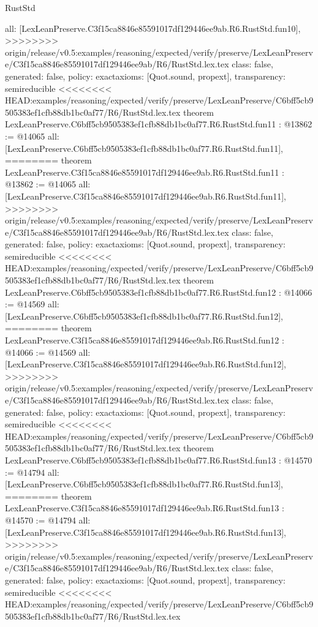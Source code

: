 \begin{lexlean}{RustStd}
\begin{coremodule}
{\begin{coremodule}
{{{{{{{{{{{{{{  all: [LexLeanPreserve.C3f15ca8846e85591017df129446ee9ab.R6.RustStd.fun10],
>>>>>>>> origin/release/v0.5:examples/reasoning/expected/verify/preserve/LexLeanPreserve/C3f15ca8846e85591017df129446ee9ab/R6/RustStd.lex.tex
  class: false,
  generated: false,
  policy: exact{axioms: [Quot.sound, propext]},
  transparency: semireducible
}
<<<<<<<< HEAD:examples/reasoning/expected/verify/preserve/LexLeanPreserve/C6bff5cb9505383ef1cfb88db1bc0af77/R6/RustStd.lex.tex
theorem LexLeanPreserve.C6bff5cb9505383ef1cfb88db1bc0af77.R6.RustStd.fun11 : @13862 := @14065 {
  all: [LexLeanPreserve.C6bff5cb9505383ef1cfb88db1bc0af77.R6.RustStd.fun11],
========
theorem LexLeanPreserve.C3f15ca8846e85591017df129446ee9ab.R6.RustStd.fun11 : @13862 := @14065 {
  all: [LexLeanPreserve.C3f15ca8846e85591017df129446ee9ab.R6.RustStd.fun11],
>>>>>>>> origin/release/v0.5:examples/reasoning/expected/verify/preserve/LexLeanPreserve/C3f15ca8846e85591017df129446ee9ab/R6/RustStd.lex.tex
  class: false,
  generated: false,
  policy: exact{axioms: [Quot.sound, propext]},
  transparency: semireducible
}
<<<<<<<< HEAD:examples/reasoning/expected/verify/preserve/LexLeanPreserve/C6bff5cb9505383ef1cfb88db1bc0af77/R6/RustStd.lex.tex
theorem LexLeanPreserve.C6bff5cb9505383ef1cfb88db1bc0af77.R6.RustStd.fun12 : @14066 := @14569 {
  all: [LexLeanPreserve.C6bff5cb9505383ef1cfb88db1bc0af77.R6.RustStd.fun12],
========
theorem LexLeanPreserve.C3f15ca8846e85591017df129446ee9ab.R6.RustStd.fun12 : @14066 := @14569 {
  all: [LexLeanPreserve.C3f15ca8846e85591017df129446ee9ab.R6.RustStd.fun12],
>>>>>>>> origin/release/v0.5:examples/reasoning/expected/verify/preserve/LexLeanPreserve/C3f15ca8846e85591017df129446ee9ab/R6/RustStd.lex.tex
  class: false,
  generated: false,
  policy: exact{axioms: [Quot.sound, propext]},
  transparency: semireducible
}
<<<<<<<< HEAD:examples/reasoning/expected/verify/preserve/LexLeanPreserve/C6bff5cb9505383ef1cfb88db1bc0af77/R6/RustStd.lex.tex
theorem LexLeanPreserve.C6bff5cb9505383ef1cfb88db1bc0af77.R6.RustStd.fun13 : @14570 := @14794 {
  all: [LexLeanPreserve.C6bff5cb9505383ef1cfb88db1bc0af77.R6.RustStd.fun13],
========
theorem LexLeanPreserve.C3f15ca8846e85591017df129446ee9ab.R6.RustStd.fun13 : @14570 := @14794 {
  all: [LexLeanPreserve.C3f15ca8846e85591017df129446ee9ab.R6.RustStd.fun13],
>>>>>>>> origin/release/v0.5:examples/reasoning/expected/verify/preserve/LexLeanPreserve/C3f15ca8846e85591017df129446ee9ab/R6/RustStd.lex.tex
  class: false,
  generated: false,
  policy: exact{axioms: [Quot.sound, propext]},
  transparency: semireducible
}
<<<<<<<< HEAD:examples/reasoning/expected/verify/preserve/LexLeanPreserve/C6bff5cb9505383ef1cfb88db1bc0af77/R6/RustStd.lex.tex
}}}}}}}}}}}}}}}}
\end{coremodule}}
\end{coremodule}
\end{lexlean}
